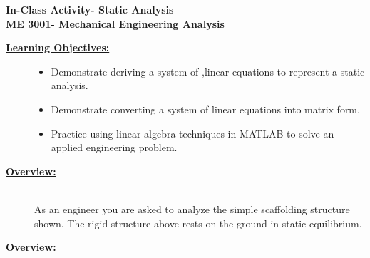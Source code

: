 \documentclass[12pt]{article}
\newcommand{\COURNAME}{ME 3001}
\newcommand{\ANUM}{6} %
\newcommand{\activitytitle}{Static Analysis} %
\begin{document}
\thispagestyle{plain}

\begin{center}
   {\bf \Large In-Class Activity\hspc\ANUM\hspc - \activitytitle}\vspace{3mm}\\
   {\bf \large \COURNAME - Mechanical Engineering Analysis} \vspace{3mm}\\
\end{center}

\begin{description}


\item[\textbf{\underline{Learning Objectives:}}] \hfill \vspace{0mm}

\begin{itemize}
	\item Demonstrate deriving a system of ,linear equations to represent a static analysis.
	\item Demonstrate converting a system of linear equations into matrix form.
	\item Practice using linear algebra techniques in MATLAB to solve an applied engineering problem.
\end{itemize}


\item[\textbf{\underline{Overview:}}] \hfill \vspace{3mm}\\

As an engineer you are asked to analyze the simple scaffolding structure shown. The rigid structure above rests on the ground in static equilibrium. 

\item[\textbf{\underline{Overview:}}] \hfill \vspace{3mm}\\
	
	
	

\end{description}
\end{document}
